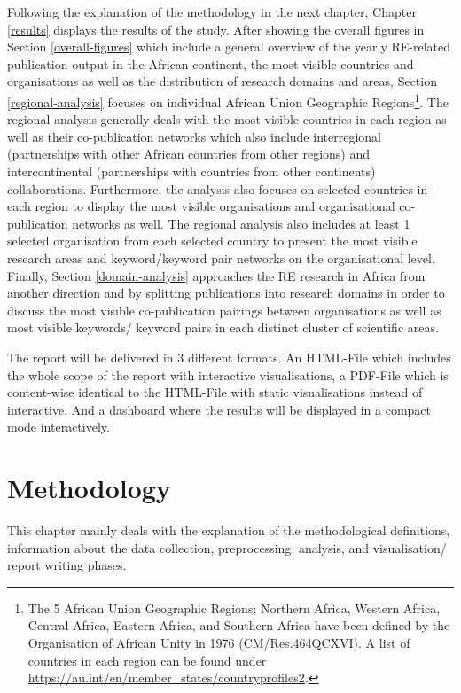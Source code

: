 \documentclass[12pt,twoside]{report}
\let\rmarkdownfootnote\footnote%
\def\footnote{\protect\rmarkdownfootnote}
\begin{document}
Following the explanation of the methodology in the next chapter, Chapter \ref{results} displays the results of the study. After showing the overall figures in Section \ref{overall-figures} which include a general overview of the yearly RE-related publication output in the African continent, the most visible countries and organisations as well as the distribution of research domains and areas, Section \ref{regional-analysis} focuses on individual African Union Geographic Regions\footnote{The 5 African Union Geographic Regions; Northern Africa, Western Africa, Central Africa, Eastern Africa, and Southern Africa have been defined by the Organisation of African Unity in 1976 (CM/Res.464QCXVI). A list of countries in each region can
  be found under \url{https://au.int/en/member_states/countryprofiles2}.}. The regional analysis generally deals with the most visible countries in each region as well as their co-publication networks which also include interregional (partnerships with other African countries from other regions) and intercontinental (partnerships with countries from other continents) collaborations. Furthermore, the analysis also focuses on selected countries in each region to display the most visible organisations and organisational co-publication networks as well. The regional analysis also includes at least 1 selected organisation from each selected country to present the most visible research areas and keyword/keyword pair networks on the organisational level. Finally, Section \ref{domain-analysis} approaches the RE research in Africa from another direction and by splitting publications into research domains in order to discuss the most visible co-publication pairings between organisations as well as most visible keywords/ keyword pairs in each distinct cluster of scientific areas.

The report will be delivered in 3 different formats. An HTML-File which includes the whole scope of the report with interactive visualisations, a PDF-File which is content-wise identical to the HTML-File with static visualisations instead of interactive. And a dashboard where the results will be displayed in a compact mode interactively.

\hypertarget{method}{%
\chapter{Methodology}\label{method}}

This chapter mainly deals with the explanation of the methodological definitions, information about the data collection, preprocessing, analysis, and visualisation/ report writing phases.
\end{document}
